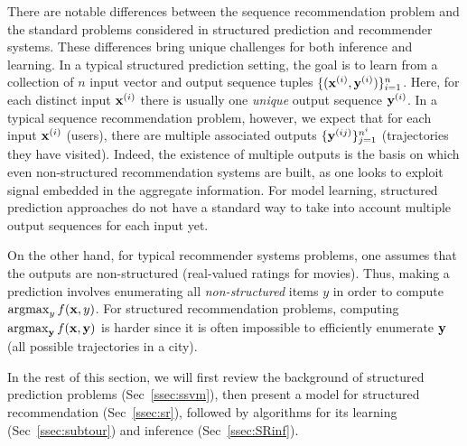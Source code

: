 There are notable differences between the sequence recommendation problem and %
the standard problems considered in structured prediction and recommender systems.
These differences bring unique challenges for both inference and learning.
In a typical structured prediction setting, the goal is to learn from a collection of $n$
input vector and output sequence tuples %
$\{ (\mathbf{x}^{({i})}, \mathbf{y}^{({i})}) \}_{i = 1}^n$. Here,
for each distinct input $\mathbf{x}^{({i})}$ there is usually one \emph{unique} output sequence $\mathbf{y}^{({i})}$.
In a typical sequence recommendation problem, however, we expect that %
for each input $\mathbf{x}^{({i})}$ (\eg users),
there %
are multiple associated outputs %
$\{ \mathbf{y}^{({ij})} \}_{j=1}^{n^i}$ (\eg trajectories they have visited).
Indeed, the existence of multiple outputs is the basis on which even non-structured recommendation systems are built, as one looks to exploit signal embedded in the aggregate information.
For model learning, structured prediction approaches do not have a standard way to take into account multiple output sequences %
for each input %
yet.

On the other hand, for typical recommender systems problems, one assumes that the outputs are non-structured (\eg real-valued ratings for movies).
Thus, making a prediction involves enumerating all {\em non-structured} items $y$ in order to compute $\operatorname*{argmax}_y f(\mathbf{x},y)$.
For structured recommendation problems, computing $\operatorname*{argmax}_{\mathbf{y}} f(\mathbf{x},\mathbf{y})$ is harder since it is often impossible to efficiently enumerate $\mathbf{y}$ (\eg all possible trajectories in a city).

In the rest of this section, we will first review the background of structured prediction problems (Sec~\ref{ssec:ssvm}), then present a model for structured recommendation (Sec~\ref{ssec:sr}), followed by algorithms for its learning (Sec~\ref{ssec:subtour}) and inference (Sec~\ref{ssec:SRinf}).


